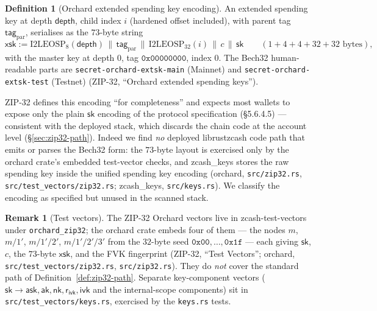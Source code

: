\documentclass[11pt,a4paper]{article}
\theoremstyle{definition}
\newtheorem{definition}[theorem]{Definition}
\newtheorem{remark}[theorem]{Remark}
\newcommand{\ask}{\ensuremath{\mathsf{ask}}}
\newcommand{\aksym}{\ensuremath{\mathsf{ak}}}
\newcommand{\nksym}{\ensuremath{\mathsf{nk}}}
\newcommand{\ivk}{\ensuremath{\mathsf{ivk}}}
\newcommand{\rivk}{\ensuremath{\mathsf{r_{ivk}}}}
\begin{document}
\begin{definition}[Orchard extended spending key encoding]\label{def:xsk-encoding}
An extended spending key at depth $\mathsf{depth}$, child index $i$
(hardened offset included), with parent tag $\mathsf{tag}_{\mathrm{par}}$,
serialises as the $73$-byte string
\[
\mathsf{xsk} := \mathrm{I2LEOSP}_{8}(\mathsf{depth}) \,\|\,
\mathsf{tag}_{\mathrm{par}} \,\|\, \mathrm{I2LEOSP}_{32}(i) \,\|\, c \,\|\,
\mathsf{sk}
\qquad (1 + 4 + 4 + 32 + 32 \text{ bytes}),
\]
with the master key at depth $0$, tag $\mathtt{0x00000000}$, index $0$.
The Bech32 human-readable parts are
\texttt{secret-orchard-extsk-main} (Mainnet) and
\texttt{secret-orchard-extsk-test} (Testnet) (ZIP-32, ``Orchard extended
spending keys'').
\end{definition}

ZIP-32 defines this encoding ``for completeness'' and expects most wallets
to expose only the plain $\mathsf{sk}$ encoding of the protocol
specification (\S5.6.4.5) --- consistent with the deployed stack, which
discards the chain code at the account level
(\S\ref{sec:zip32-path}). Indeed we find \emph{no} deployed
\textsf{librustzcash} code path that emits or parses the Bech32 form: the
$73$-byte layout is exercised only by the \textsf{orchard} crate's
embedded test-vector checks, and \textsf{zcash\_keys} stores the raw
spending key inside the unified spending key encoding (\textsf{orchard},
\texttt{src/zip32.rs}, \texttt{src/test\_vectors/zip32.rs};
\textsf{zcash\_keys}, \texttt{src/keys.rs}). We classify the encoding as
specified but unused in the scanned stack.

\begin{remark}[Test vectors]
The ZIP-32 Orchard vectors live in \textsf{zcash-test-vectors} under
\texttt{orchard\_zip32}; the \textsf{orchard} crate embeds four of them ---
the nodes $m$, $m/1'$, $m/1'/2'$, $m/1'/2'/3'$ from the $32$-byte seed
$\mathtt{0x00}, \dots, \mathtt{0x1f}$ --- each giving $\mathsf{sk}$, $c$,
the $73$-byte $\mathsf{xsk}$, and the FVK fingerprint (ZIP-32, ``Test
Vectors''; \textsf{orchard}, \texttt{src/test\_vectors/zip32.rs},
\texttt{src/zip32.rs}). They do \emph{not} cover the standard path of
Definition~\ref{def:zip32-path}. Separate key-component vectors
($\mathsf{sk} \to \ask, \aksym, \nksym, \rivk, \ivk$ and the internal-scope
components) sit in \texttt{src/test\_vectors/keys.rs}, exercised by the
\texttt{keys.rs} tests.
\end{remark}
\end{document}
